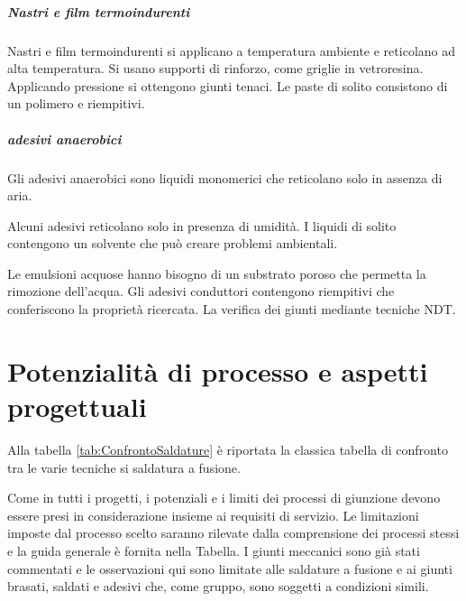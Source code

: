 \paragraph{Nastri e film termoindurenti}
Nastri e film termoindurenti si applicano a temperatura ambiente e reticolano ad alta temperatura.
Si usano supporti di rinforzo, come griglie in vetroresina.
Applicando pressione si ottengono giunti tenaci.
Le paste di solito consistono di un polimero e riempitivi.

\paragraph{adesivi anaerobici}
Gli adesivi anaerobici sono liquidi monomerici che reticolano solo in assenza di aria.

Alcuni adesivi reticolano solo in presenza di umidità. I liquidi di solito contengono un solvente che può creare problemi ambientali.

Le emulsioni acquose hanno bisogno di un substrato poroso che permetta la rimozione dell'acqua.
Gli adesivi conduttori contengono riempitivi che conferiscono la proprietà ricercata.
La verifica dei giunti mediante tecniche \ac{NDT}.

\begin{figure}
\centering
{}\quad
{}
\end{figure}


\chapter{Potenzialità di processo e aspetti progettuali}\label{chp:PotGiunzioni}
Alla tabella \ref{tab:ConfrontoSaldature} è riportata la classica tabella di confronto tra le varie tecniche si saldatura a fusione.

Come in tutti i progetti, i potenziali e i limiti dei processi di giunzione devono essere presi in considerazione insieme ai requisiti di servizio.
Le limitazioni imposte dal processo scelto saranno rilevate dalla comprensione dei processi stessi e la guida generale è fornita nella Tabella.
I giunti meccanici sono già stati commentati e le osservazioni qui sono limitate alle saldature a fusione e ai giunti brasati, saldati e adesivi che, come gruppo, sono soggetti a condizioni simili.

